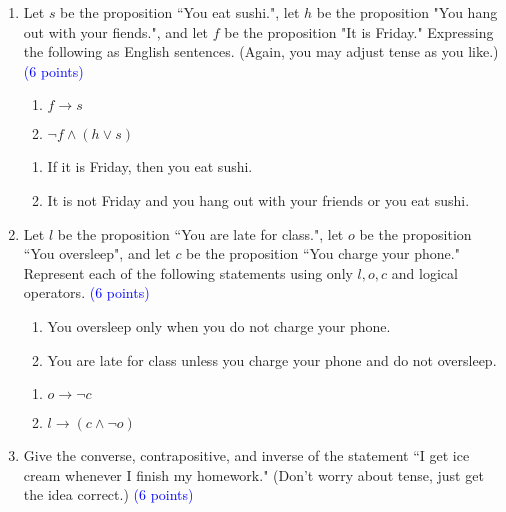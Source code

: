 \documentclass{article}
\newcommand{\pt}[1]{\textcolor{blue}{(#1 points)}}
\begin{document}
\begin{enumerate}
    \item Let $s$ be the proposition ``You eat sushi.", let $h$ be the proposition "You hang out with your fiends.", and let $f$ be the proposition "It is Friday." Expressing the following as English sentences. (Again, you may adjust tense as you like.) \pt 6
    
    \begin{enumerate}
        \item $f \rightarrow s$
        \item $\lnot f \wedge (h \vee s)$
    \end{enumerate}
    
    \begin{solution}
    \begin{enumerate}
        \item If it is Friday, then you eat sushi.
        \item It is not Friday and you hang out with your friends or you eat sushi.
    \end{enumerate}
    \end{solution}
    
    \item Let $l$ be the proposition ``You are late for class.", let $o$ be the proposition ``You oversleep", and let $c$ be the proposition ``You charge your phone." Represent each of the following statements using only $l, o, c$ and logical operators. \pt 6
    
    \begin{enumerate}
        \item You oversleep only when you do not charge your phone.
        \item You are late for class unless you charge your phone and do not oversleep.
    \end{enumerate}
    
    \begin{solution}
    \begin{enumerate}
        \item $o \rightarrow \neg c$
        \item $l \rightarrow (c \land \neg o)$
    \end{enumerate}
    \end{solution}
    
    \item Give the converse, contrapositive, and inverse of the statement ``I get ice cream whenever I finish my homework." (Don't worry about tense, just get the idea correct.) \pt 6
    

\end{enumerate}
\end{document}
